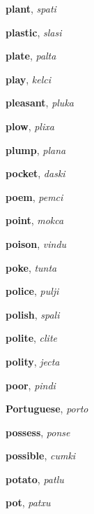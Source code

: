 \documentclass[12pt]{book}
\begin{document}
\begin{description}
\item[ ] \textbf{plant}, \textit{spati}

\item[ ] \textbf{plastic}, \textit{slasi}

\item[ ] \textbf{plate}, \textit{palta}

\item[ ] \textbf{play}, \textit{kelci}

\item[ ] \textbf{pleasant}, \textit{pluka}

\item[ ] \textbf{plow}, \textit{plixa}

\item[ ] \textbf{plump}, \textit{plana}

\item[ ] \textbf{pocket}, \textit{daski}

\item[ ] \textbf{poem}, \textit{pemci}

\item[ ] \textbf{point}, \textit{mokca}

\item[ ] \textbf{poison}, \textit{vindu}

\item[ ] \textbf{poke}, \textit{tunta}

\item[ ] \textbf{police}, \textit{pulji}

\item[ ] \textbf{polish}, \textit{spali}

\item[ ] \textbf{polite}, \textit{clite}

\item[ ] \textbf{polity}, \textit{jecta}

\item[ ] \textbf{poor}, \textit{pindi}

\item[ ] \textbf{Portuguese}, \textit{porto}

\item[ ] \textbf{possess}, \textit{ponse}

\item[ ] \textbf{possible}, \textit{cumki}

\item[ ] \textbf{potato}, \textit{patlu}

\item[ ] \textbf{pot}, \textit{patxu}


\end{description}
\end{document}
